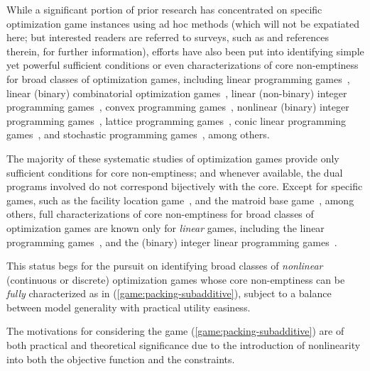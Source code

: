 \documentclass[11pt]{article}\usepackage[]{graphicx}\usepackage[]{xcolor}
\begin{document}
While a significant portion of prior research has concentrated on specific optimization game instances using ad hoc methods (which will not be expatiated here; but interested readers are referred to surveys, such as \cite{Curiel1997,borm2001operations,nagarajan2008game,dror2011survey} and references therein, for further information), efforts have also been put into identifying simple yet powerful sufficient conditions or even characterizations of core non-emptiness for broad classes of optimization games, including linear programming games~\citep{owen1975core,granot1986generalized,samet1984core}, linear (binary) combinatorial optimization games~\citep{deng1999algorithmic,faigle2000core,deng2000totally,bilbao2012cooperative}, linear (non-binary) integer programming games~\citep{caprara2010new}, convex programming games~\citep{kalai1982generalized,dubey1984totally}, nonlinear (binary) integer programming games~\citep{liu2016computing}, lattice programming games~\citep{Topkis1998}, conic linear programming games~\citep{puerto2022conic}, and stochastic programming games~\citep{chen2009stochastic,zhang2009cost,uhan2015stochastic,chen2016duality}, among others. 


The majority of these systematic studies of optimization games provide only sufficient conditions for core non-emptiness; and whenever available, the dual programs involved do not correspond bijectively with the core. Except for specific games, such as the facility location game~\citep{goemans2004cooperative}, and the matroid base game~\citep{nagamochi1997complexity}, among others, full characterizations of core non-emptiness for broad classes of optimization games are known only for \emph{linear} games, including the linear programming games~\citep{samet1984core}, and the (binary) integer linear programming games~\citep{deng1999algorithmic}. 

This status begs for the pursuit on identifying broad classes of \emph{nonlinear} (continuous or discrete) optimization games whose core non-emptiness can be \emph{fully} characterized as in (\ref{game:packing-subadditive}), subject to a balance between model generality with practical utility easiness.  



The motivations for considering the game (\ref{game:packing-subadditive}) are of both practical and theoretical significance due to the introduction of nonlinearity into both the objective function and the constraints.
\end{document}
